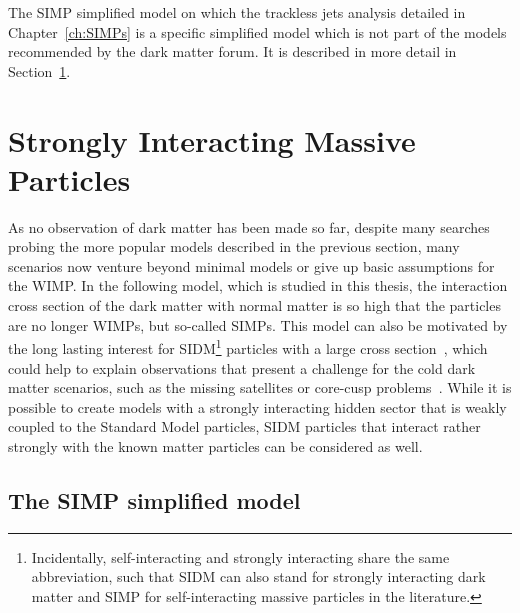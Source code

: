 The \acs{SIMP} simplified model on which the trackless jets analysis detailed in Chapter~\ref{ch:SIMPs} is a specific simplified model which is not part of the models recommended by the dark matter forum. It is described in more detail in Section~\ref{sec:SIMP}.

\section{Strongly Interacting Massive Particles}
\label{sec:SIMP}

As no observation of dark matter has been made so far, despite many searches probing the more popular models described in the previous section, many scenarios now venture beyond minimal models or give up basic assumptions for the \ac{WIMP}. In the following model, which is studied in this thesis, the interaction cross section of the dark matter with normal matter is so high that the particles are no longer \acp{WIMP}, but so-called \acp{SIMP}. This model can also be motivated by the long lasting interest for \ac{SIDM}\footnote{Incidentally, self-interacting and strongly interacting share the same abbreviation, such that SIDM can also stand for strongly interacting dark matter and SIMP for self-interacting massive particles in the literature.} particles with a large cross section~\cite{Spergel:1999mh}, which could help to explain observations that present a challenge for the cold dark matter scenarios, such as the missing satellites or core-cusp problems~\cite{Bullock:2010uy,BoylanKolchin:2011de, Weinberg:2013aya,Famaey:2013ty}. While it is possible to create models with a strongly interacting hidden sector that is weakly coupled to the Standard Model particles, \ac{SIDM} particles that interact rather strongly with the known matter particles can be considered as well.

\subsection{The SIMP simplified model}

